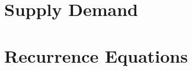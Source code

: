 \documentclass[11pt, a4paper]{article}
\begin{document}
\section{Supply \amp Demand}

\section{Recurrence Equations}
\end{document}
